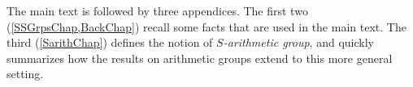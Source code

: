 The main text is followed by three appendices. The first two (\cref{SSGrpsChap,BackChap}) recall some facts that are used in the main text. The third (\cref{SarithChap}) defines the notion of \emph{$S$-arithmetic group}, and quickly summarizes how the results on arithmetic groups extend to this more general setting. 

\makemarkstrue %

